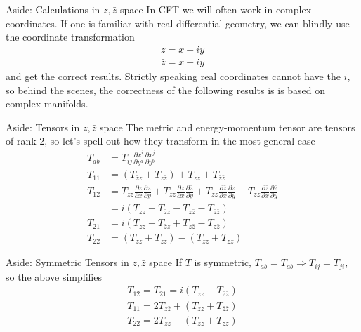 \documentclass{beamer}
\begin{document}
\begin{frame}{Aside: Calculations in $z,\bar{z}$ space}
    In CFT we will often work in complex coordinates. If one is familiar with real differential geometry, we can blindly use the coordinate transformation
    \begin{align}
        z=x+i y \\
        \bar{z}=x-i y
    \end{align}
    and get the correct results. Strictly speaking real coordinates cannot have the $i$, so behind the scenes, the correctness of the following results is is based on complex manifolds. 
\end{frame}
\begin{frame}{Aside: Tensors in $z,\bar{z}$ space}
    The metric and energy-momentum tensor are tensors of rank $2$, so let's spell out how they transform in the most general case
    \begin{align}
         T_{a b}& =T_{i j} \frac{\partial x^i}{\partial y^a} \frac{\partial x^j}{\partial y^b} \\
         T_{11} & = (T_{\bar z z} + T_{z\bar z} )+ T_{ z z } + T_{\bar z \bar z} \\
         T_{12}&= T_{zz} \frac{\partial z}{\partial x} \frac{\partial z}{\partial y}+ T_{z\bar{z}}\frac{\partial z}{\partial x} \frac{\partial \bar z}{\partial y} + T_{\bar{z}z} \frac{\partial \bar  z}{\partial x}\frac{\partial z}{\partial y}+ T_{\bar z\bar{z}}\frac{\partial \bar z}{\partial x}\frac{\partial \bar  z}{\partial y} \\
         & =i\left(T_{z z}+T_{\bar{z} z}-T_{z \bar{z}}-T_{\bar{z} \bar{z}}\right) \\
         T_{21}&=i\left(T_{z z}-T_{\bar{z} z}+T_{z \bar{z}}-T_{z \bar{z}}\right)  \\
         T_{22}&=\left(T_{z \bar{z}}+T_{\bar{z}{z}}\right)-\left(T_{z z}+T_{\bar z \bar z}\right)
    \end{align}
\end{frame}
\begin{frame}{Aside: Symmetric Tensors in $z,\bar{z}$ space}
    If $T$ is symmetric, $T_{ab}=T_{ab} \Rightarrow T_{ij} = T_{ji}$, so the above simplifies
    \begin{align}
        T_{12} = T_{21} = i(T_{zz} - T_{\bar z \bar z})\\
        T_{11} = 2T_{z\bar z} + (T_{zz} + T_{\bar z \bar z})\\
        T_{22} = 2T_{z\bar z} - (T_{zz} + T_{\bar z \bar z})
    \end{align}
\end{frame}
\end{document}
